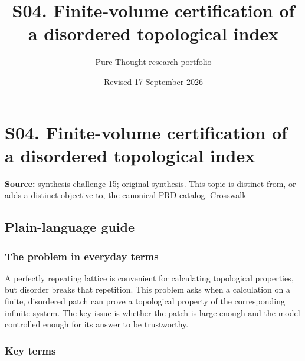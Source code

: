 \documentclass[
  11pt,
]{article}
\title{S04. Finite-volume certification of a disordered topological
index}
\author{Pure Thought research portfolio}
\date{Revised 17 September 2026}
\begin{document}
\maketitle
\thispagestyle{empty}
\clearpage

\section{S04. Finite-volume certification of a disordered topological
index}

\textbf{Source:} synthesis challenge 15;
\href{https://github.com/rick-stevens-ai/Pure-Thought/blob/main/NOTES/30-Most-Compelling-Pure-Thought-AI-Challenges.md}{original
synthesis}. This topic is distinct from, or adds a distinct objective
to, the canonical PRD catalog.
\href{https://github.com/rick-stevens-ai/Pure-Thought/blob/main/reviews/SYNTHESIS-CROSSWALK.md}{Crosswalk}

\subsection{Plain-language guide}

\subsubsection{The problem in everyday terms}

A perfectly repeating lattice is convenient for calculating topological
properties, but disorder breaks that repetition. This problem asks when
a calculation on a finite, disordered patch can prove a topological
property of the corresponding infinite system. The key issue is whether
the patch is large enough and the model controlled enough for its answer
to be trustworthy.

\subsubsection{Key terms}
\end{document}
